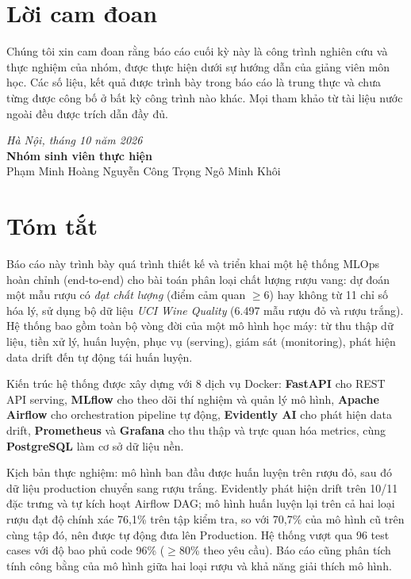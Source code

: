 \documentclass[12pt,a4paper]{report}
\begin{document}
\chapter*{Lời cam đoan}

Chúng tôi xin cam đoan rằng báo cáo cuối kỳ này là công trình nghiên cứu và thực nghiệm của nhóm, được thực hiện dưới sự hướng dẫn của giảng viên môn học. Các số liệu, kết quả được trình bày trong báo cáo là trung thực và chưa từng được công bố ở bất kỳ công trình nào khác. Mọi tham khảo từ tài liệu nước ngoài đều được trích dẫn đầy đủ.

\vspace{2cm}
\begin{flushright}
  \textit{Hà Nội, tháng 10 năm 2026}\\[1cm]
  \textbf{Nhóm sinh viên thực hiện}\\[0.3cm]
  Phạm Minh Hoàng \quad Nguyễn Công Trọng \quad Ngô Minh Khôi
\end{flushright}

\chapter*{Tóm tắt}

Báo cáo này trình bày quá trình thiết kế và triển khai một hệ thống MLOps hoàn chỉnh (end-to-end) cho bài toán phân loại chất lượng rượu vang: dự đoán một mẫu rượu có \textit{đạt chất lượng} (điểm cảm quan $\geq 6$) hay không từ 11 chỉ số hóa lý, sử dụng bộ dữ liệu \textit{UCI Wine Quality} (6.497 mẫu rượu đỏ và rượu trắng). Hệ thống bao gồm toàn bộ vòng đời của một mô hình học máy: từ thu thập dữ liệu, tiền xử lý, huấn luyện, phục vụ (serving), giám sát (monitoring), phát hiện data drift đến tự động tái huấn luyện.

Kiến trúc hệ thống được xây dựng với 8 dịch vụ Docker: \textbf{FastAPI} cho REST API serving, \textbf{MLflow} cho theo dõi thí nghiệm và quản lý mô hình, \textbf{Apache Airflow} cho orchestration pipeline tự động, \textbf{Evidently AI} cho phát hiện data drift, \textbf{Prometheus} và \textbf{Grafana} cho thu thập và trực quan hóa metrics, cùng \textbf{PostgreSQL} làm cơ sở dữ liệu nền.

Kịch bản thực nghiệm: mô hình ban đầu được huấn luyện trên rượu đỏ, sau đó dữ liệu production chuyển sang rượu trắng. Evidently phát hiện drift trên 10/11 đặc trưng và tự kích hoạt Airflow DAG; mô hình huấn luyện lại trên cả hai loại rượu đạt độ chính xác 76,1\% trên tập kiểm tra, so với 70,7\% của mô hình cũ trên cùng tập đó, nên được tự động đưa lên Production. Hệ thống vượt qua 96 test cases với độ bao phủ code 96\% ($\geq$80\% theo yêu cầu). Báo cáo cũng phân tích tính công bằng của mô hình giữa hai loại rượu và khả năng giải thích mô hình.
\end{document}
